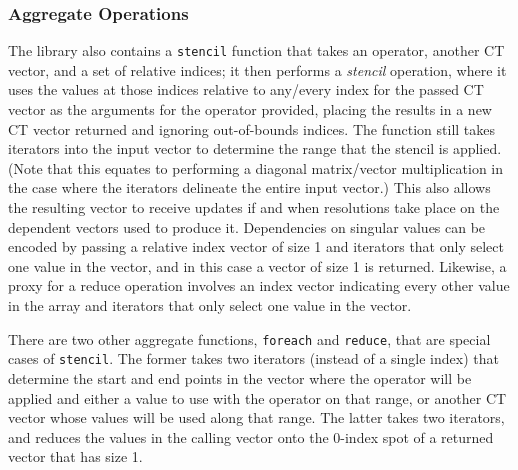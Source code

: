\documentclass[pageno]{jpaper}
\begin{document}
\subsubsection{Aggregate Operations}
The library also contains a \texttt{stencil} function that takes an operator,
another CT vector, and a set of relative indices; it then performs a 
\textit{stencil} operation, where it uses the values at those indices relative to
any/every index for the passed CT vector as the arguments for the operator
provided, placing the results in a new CT vector returned and ignoring
out-of-bounds indices. The function still takes iterators into the input vector
to determine the range that the stencil is applied. (Note that this equates to
performing a diagonal matrix/vector multiplication in the case where the iterators
delineate the entire input vector.) This also allows
the resulting vector to receive updates if and when resolutions take place on
the dependent vectors used to produce it. Dependencies on singular values can be
encoded by passing a relative index vector of size 1 and iterators that only
select one value in the vector, and in this case a vector of size 1 is returned.
Likewise, a proxy for a reduce operation involves an index vector indicating
every other value in the array and iterators that only select one value in the
vector.

There are two other aggregate functions, \texttt{foreach} and \texttt{reduce}, that are
special cases of \texttt{stencil}. The
former takes two iterators (instead of a single index) that determine the start
and end points in the vector where the operator will be applied and either a value to use 
with the operator on that range, or another CT vector whose values will be used along 
that range. The latter takes two iterators, and reduces the values in the calling 
vector onto the 0-index spot of a returned vector that has size 1.
\end{document}
